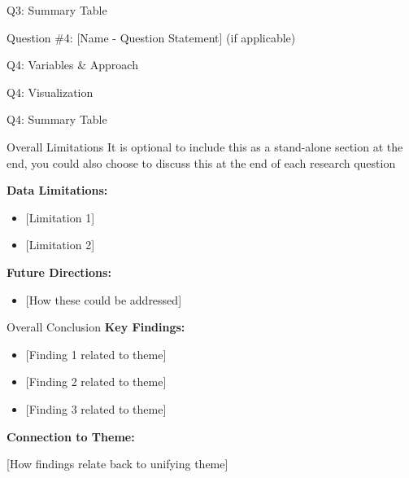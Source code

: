 \documentclass[
  ignorenonframetext,
  aspectratio=169,
]{beamer}
\providecommand{\tightlist}{%
  \setlength{\itemsep}{0pt}\setlength{\parskip}{0pt}}
\begin{document}
\begin{frame}{Q3: Summary Table}
\protect{}\label{q3-summary-table}
\end{frame}

\begin{frame}{Question \#4: {[}Name - Question Statement{]} (if
applicable)}
\protect{}\label{question-4-name---question-statement-if-applicable}
\end{frame}

\begin{frame}{Q4: Variables \& Approach}
\protect{}\label{q4-variables-approach}
\end{frame}

\begin{frame}{Q4: Visualization}
\protect{}\label{q4-visualization}
\end{frame}

\begin{frame}{Q4: Summary Table}
\protect{}\label{q4-summary-table}
\end{frame}

\begin{frame}{Overall Limitations}
\protect{}\label{overall-limitations}
It is optional to include this as a stand-alone section at the end, you
could also choose to discuss this at the end of each research question

\textbf{Data Limitations:}

\begin{itemize}
\tightlist
\item
  {[}Limitation 1{]}
\item
  {[}Limitation 2{]}
\end{itemize}

\textbf{Future Directions:}

\begin{itemize}
\tightlist
\item
  {[}How these could be addressed{]}
\end{itemize}
\end{frame}

\begin{frame}{Overall Conclusion}
\protect{}\label{overall-conclusion}
\textbf{Key Findings:}

\begin{itemize}
\tightlist
\item
  {[}Finding 1 related to theme{]}
\item
  {[}Finding 2 related to theme{]}
\item
  {[}Finding 3 related to theme{]}
\end{itemize}

\textbf{Connection to Theme:}

{[}How findings relate back to unifying theme{]}
\end{frame}
\end{document}
